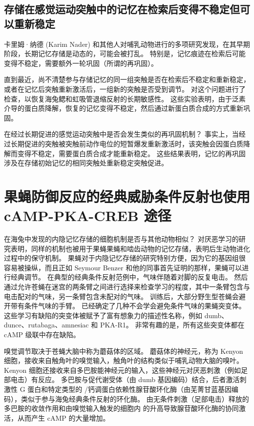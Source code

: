 \subsection{存储在感觉运动突触中的记忆在检索后变得不稳定但可以重新稳定}

卡里姆·纳德 (Karim Nader) 和其他人对哺乳动物进行的多项研究发现，在其早期阶段，长期记忆存储是动态的，可能会被打乱。
特别是，记忆痕迹在检索后可能变得不稳定，需要额外一轮巩固（所谓的再巩固）。


直到最近，尚不清楚参与存储记忆的同一组突触是否在检索后不稳定和重新稳定，或者在记忆后突触重新激活后，一组新的突触是否受到调节。
对这个问题进行了检查，以恢复海兔鳃和虹吸管退缩反射的长期敏感性。
这些实验表明，由于泛素介导的蛋白质降解，恢复的记忆变得不稳定，然后通过新蛋白质合成的方式重新巩固。


在经过长期促进的感觉运动突触中是否会发生类似的再巩固机制？
事实上，当经过长期促进的突触被突触前动作电位的短暂爆发重新激活时，该突触会因蛋白质降解而变得不稳定，需要蛋白质合成才能重新稳定。
这些结果表明，记忆的再巩固涉及在存储初始记忆的相同突触处重新稳定突触促进。



\section{果蝇防御反应的经典威胁条件反射也使用 cAMP-PKA-CREB 途径}

在海兔中发现的内隐记忆存储的细胞机制是否与其他动物相似？
对厌恶学习的研究表明，同样的机制也被用于果蝇果蝇和啮齿动物的记忆存储，表明后生动物进化过程中的保守机制。
果蝇对于内隐记忆存储的研究特别方便，因为它的基因组很容易被操纵，而且正如 Seymour Benzer 和他的同事首先证明的那样，果蝇可以进行经典调节。
在典型的经典条件反射范例中，气味伴随着对脚的反复电击。
然后通过允许苍蝇在迷宫的两条臂之间进行选择来检查学习的程度，其中一条臂包含与电击配对的气味，另一条臂包含未配对的气味。
训练后，大部分野生型苍蝇会避开带有条件气味的手臂。
已经确定了几种不会学会避免条件气味的果蝇突变体。
这些学习有缺陷的突变体被赋予了富有想象力的描述性名称，例如 dumb、dunce、rutabaga、amnesiac 和 PKA-R1。
非常有趣的是，所有这些突变体都在 cAMP 级联中存在缺陷。


嗅觉调节取决于苍蝇大脑中称为蘑菇体的区域。
蘑菇体的神经元，称为 Kenyon 细胞，接收来自触角叶的嗅觉输入，触角叶的结构类似于哺乳动物大脑的嗅叶。
Kenyon 细胞还接收来自多巴胺能神经元的输入，这些神经元对厌恶刺激（例如足部电击）有反应。
多巴胺与促代谢受体（由 dumb 基因编码）结合，后者激活刺激性 G 蛋白和特定类型的 /钙调蛋白依赖性腺苷酸环化酶（由芜菁甘蓝基因编码），类似于参与海兔经典条件反射的环化酶。
由无条件刺激（足部电击）释放的多巴胺的收敛作用和由嗅觉输入触发的细胞内  的升高导致腺苷酸环化酶的协同激活，从而产生 cAMP 的大量增加。


